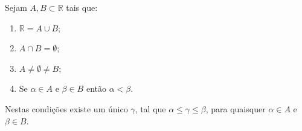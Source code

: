 \documentclass[../main.tex]{subfiles}
\begin{document}
\begin{teo}\label{reais-teo-completude}
    Sejam $A,B \subset \mathbb{R}$ tais que:
    \begin{enumerate}[label=(\roman*)]
        \item\label{reais-dummyCompletude-igualR} $\mathbb{R} = A \cup B$;
        \item\label{reais-dummyCompletude-disjuntos} $A \cap B = \emptyset$;
        \item\label{reais-dummyCompletude-naoVazios} $A \neq \emptyset \neq B$;
        \item\label{reais-dummyCompletude-alphaMenorBeta} Se $\alpha \in A$ e $\beta \in B$ então $\alpha < \beta$.
    \end{enumerate}
    Nestas condições existe um único $\gamma$, tal que $\alpha \leq \gamma \leq \beta$, para quaisquer $\alpha \in A$ e $\beta \in B$.
\end{teo}
\end{document}
